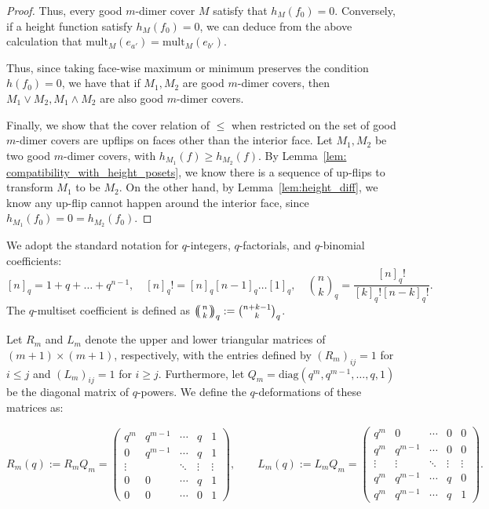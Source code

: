 \documentclass[11pt]{amsart}
\newcommand\m[1]{\begin{pmatrix}#1\end{pmatrix}}
\theoremstyle{definition}
\theoremstyle{remark}
\numberwithin{equation}{section}
\def\multiset#1#2{\ensuremath{\left(\kern-.3em\left(\genfrac{}{}{0pt}{}{#1}{#2}\right)\kern-.3em\right)}}
\def\multiset#1#2{\ensuremath{\left(\kern-.3em\left(\genfrac{}{}{0pt}{}{#1}{#2}\right)\kern-.3em\right)}}
\begin{document}
\begin{proof}
    Thus, every good $m$-dimer cover $M$ satisfy that $h_M(f_0) = 0$. Conversely, if a height function satisfy $h_M(f_0) = 0$, we can deduce from the above calculation that $\text{mult}_{M}(e_{a'}) = \text{mult}_{M}(e_{b'})$. 

    Thus, since taking face-wise maximum or minimum preserves the condition $h(f_0) = 0$, we have that if $M_1, M_2$ are good $m$-dimer covers, then $M_1\vee M_2, M_1\wedge M_2$ are also good $m$-dimer covers.

    Finally, we show that the cover relation of $\leq$ when restricted on the set of good $m$-dimer covers are upflips on faces other than the interior face. Let $M_1, M_2$ be two good $m$-dimer covers, with $h_{M_1}(f)\geq h_{M_2}(f)$. By Lemma~\ref{lem: compatibility_with_height_posets}, we know there is a sequence of up-flips to transform $M_1$ to be $M_2$. On the other hand, by Lemma~\ref{lem:height_diff}, we know any up-flip cannot happen around the interior face, since $h_{M_1}(f_0) = 0 = h_{M_2}(f_0)$. 
\end{proof}

We adopt the standard notation for $q$-integers, $q$-factorials, and $q$-binomial coefficients:
\[
[n]_q = 1 + q + \dots + q^{n-1}, \quad [n]_q! = [n]_q [n-1]_q \dots [1]_q, \quad \binom{n}{k}_q = \frac{[n]_q!}{[k]_q! [n-k]_q!}.
\]
The $q$-multiset coefficient is defined as $\multiset{n}{k}_q := \binom{n+k-1}{k}_q$.

Let $R_m$ and $L_m$ denote the upper and lower triangular matrices of $(m+1) \times (m+1)$, respectively, with the entries defined by $(R_m)_{ij} = 1$ for $i \leq j$ and $(L_m)_{ij} = 1$ for $i \geq j$. Furthermore, let $Q_m = \text{diag}(q^m, q^{m-1}, \dots, q, 1)$ be the diagonal matrix of $q$-powers. We define the $q$-deformations of these matrices as:

\[
R_{m}(q):=R_m Q_m= \m{q^m & q^{m-1} & \cdots & q & 1 \\
    0 & q^{m-1} & \cdots & q & 1 \\
    \vdots & & \ddots & \vdots & \vdots \\
    0 & 0 & \cdots & q & 1 \\
    0 & 0 & \cdots & 0 & 1 }, \qquad 
L_{m}(q) :=L_m Q_m= \m{q^m & 0 & \cdots & 0 & 0 \\
    q^m & q^{m-1} & \cdots & 0 & 0 \\
    \vdots & \vdots & \ddots & \vdots & \vdots \\
    q^m & q^{m-1} & \cdots & q & 0 \\
    q^m & q^{m-1} & \cdots & q & 1}.
\]
\end{document}
